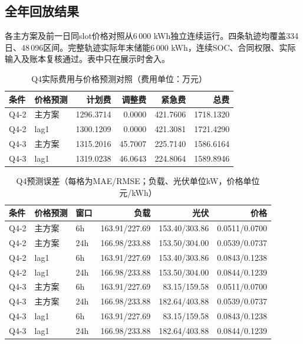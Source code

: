\subsection{全年回放结果}
各主方案及前一日同slot价格对照从6\,000 kWh独立连续运行。四条轨迹均覆盖334日、48\,096区间。完整轨迹实际年末储能6\,000 kWh，连续SOC、合同权限、实际输入及账本复核通过。表中只在展示时舍入。
\begin{table}[htbp]\centering\small
\caption{Q4实际费用与价格预测对照（费用单位：万元）}\label{tab:q4-annual}
\begin{tabular}{llrrrr}\toprule
条件 & 价格预测 & 计划费 & 调整费 & 紧急费 & 总费 \\ \midrule
Q4-2 & 主方案 & 1296.3714 & 0.0000 & 421.7606 & 1718.1320 \\
Q4-2 & lag1 & 1300.1209 & 0.0000 & 421.3081 & 1721.4290 \\
Q4-3 & 主方案 & 1315.2016 & 45.7007 & 225.7140 & 1586.6164 \\
Q4-3 & lag1 & 1319.0238 & 46.0643 & 224.8064 & 1589.8946 \\
\bottomrule\end{tabular}\end{table}
\begin{table}[htbp]\centering\small
\caption{Q4预测误差（每格为MAE/RMSE；负载、光伏单位kW，价格单位元/kWh）}
\begin{tabular}{lllrrr}\toprule
条件 & 价格预测 & 窗口 & 负载 & 光伏 & 价格 \\ \midrule
Q4-2 & 主方案 & 6h & 163.91/227.69 & 153.40/303.86 & 0.0511/0.0700 \\
Q4-2 & 主方案 & 24h & 166.98/233.88 & 153.50/304.00 & 0.0539/0.0737 \\
Q4-2 & lag1 & 6h & 163.91/227.69 & 153.40/303.86 & 0.0843/0.1238 \\
Q4-2 & lag1 & 24h & 166.98/233.88 & 153.50/304.00 & 0.0844/0.1239 \\
Q4-3 & 主方案 & 6h & 163.91/227.69 & 83.15/159.58 & 0.0511/0.0700 \\
Q4-3 & 主方案 & 24h & 166.98/233.88 & 182.64/403.88 & 0.0539/0.0737 \\
Q4-3 & lag1 & 6h & 163.91/227.69 & 83.15/159.58 & 0.0843/0.1238 \\
Q4-3 & lag1 & 24h & 166.98/233.88 & 182.64/403.88 & 0.0844/0.1239 \\
\bottomrule\end{tabular}\end{table}

